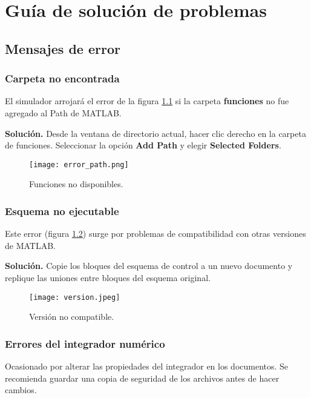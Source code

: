 \chapter{Guía de solución de problemas}
\label{chapter: troubleshooting}

\section{Mensajes de error}

\subsection{Carpeta no encontrada}
El simulador arrojará el error de la figura 
\ref{fig: path error} si la carpeta \textbf{funciones}
no fue agregado al Path de MATLAB.

\textbf{Solución.} Desde la ventana de directorio actual, 
hacer clic derecho en la carpeta de funciones.
Seleccionar la opción \textbf{Add Path} y elegir \textbf{Selected Folders}.

\begin{figure}[htb!]
 \centering
 \texttt{[image: error\_path.png]}
 \caption{Funciones no disponibles.}
 \label{fig: path error}
\end{figure}

\subsection{Esquema no ejecutable}
Este error (figura \ref{fig: version}) surge por problemas de compatibilidad con otras versiones de MATLAB.

\textbf{Solución.}
Copie los bloques del esquema de control a un nuevo documento y 
replique las uniones entre bloques del esquema original.

\begin{figure}[htb!]
 \centering
 \texttt{[image: version.jpeg]}
 \caption{Versión no compatible.}
 \label{fig: version}
\end{figure}


\subsection{Errores del integrador numérico}
Ocasionado por alterar las propiedades del integrador en
los documentos. 
Se recomienda guardar una copia de seguridad 
de los archivos antes de hacer cambios.

